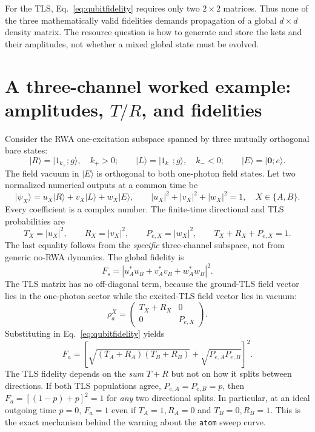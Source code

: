 \documentclass[11pt,a4paper]{article}
\newcommand{\ket}[1]{\lvert #1\rangle}
\newcommand{\code}[1]{\nolinkurl{#1}}
\begin{document}
For the TLS, Eq.~\eqref{eq:qubitfidelity} requires only two $2\times2$ matrices. Thus none of the three mathematically valid fidelities demands propagation of a global $d\times d$ density matrix. The resource question is how to generate and store the kets and their amplitudes, not whether a mixed global state must be evolved.

\section[A three-channel worked example: amplitudes, T/R, and fidelities]{A three-channel worked example: amplitudes, $T/R$, and fidelities}
\label{app:threechannel}
Consider the RWA one-excitation subspace spanned by three mutually orthogonal bare states:
\begin{equation}
 \ket R=\ket{1_{k_+};g},\quad k_+>0;\qquad
 \ket L=\ket{1_{k_-};g},\quad k_-<0;\qquad
 \ket E=\ket{\mathbf0;e}.
 \label{eq:threebasis}
\end{equation}
The field vacuum in $\ket E$ is orthogonal to both one-photon field states. Let two normalized numerical outputs at a common time be
\begin{equation}
 \ket{\psi_X}=u_X\ket R+v_X\ket L+w_X\ket E,
 \qquad |u_X|^2+|v_X|^2+|w_X|^2=1,\quad X\in\{A,B\}.
 \label{eq:threevector}
\end{equation}
Every coefficient is a complex number. The finite-time directional and TLS probabilities are
\begin{equation}
 T_X=|u_X|^2,\qquad R_X=|v_X|^2,\qquad P_{e,X}=|w_X|^2,
 \qquad T_X+R_X+P_{e,X}=1.
 \label{eq:threeprob}
\end{equation}
The last equality follows from the \emph{specific} three-channel subspace, not from generic no-RWA dynamics. The global fidelity is
\begin{equation}
 F_s=|u_A^*u_B+v_A^*v_B+w_A^*w_B|^2.
 \label{eq:threeglobal}
\end{equation}
The TLS matrix has no off-diagonal term, because the ground-TLS field vector lies in the one-photon sector while the excited-TLS field vector lies in vacuum:
\begin{equation}
 \rho_a^X=\begin{pmatrix}T_X+R_X&0\\0&P_{e,X}\end{pmatrix}.
 \label{eq:threerhoa}
\end{equation}
Substituting in Eq.~\eqref{eq:qubitfidelity} yields
\begin{equation}
 F_a=\left[\sqrt{(T_A+R_A)(T_B+R_B)}
 +\sqrt{P_{e,A}P_{e,B}}\right]^2.
 \label{eq:threeatomf}
\end{equation}
The TLS fidelity depends on the \emph{sum} $T+R$ but not on how it splits between directions. If both TLS populations agree, $P_{e,A}=P_{e,B}=p$, then $F_a=[(1-p)+p]^2=1$ for \emph{any} two directional splits. In particular, at an ideal outgoing time $p=0$, $F_a=1$ even if $T_A=1,R_A=0$ and $T_B=0,R_B=1$. This is the exact mechanism behind the warning about the \code{atom} sweep curve.
\end{document}

